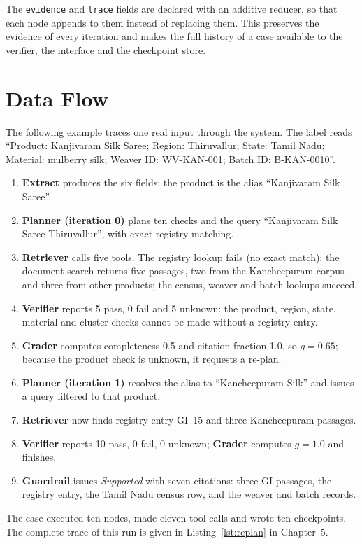 The \texttt{evidence} and \texttt{trace} fields are declared with an additive reducer, so that each
node appends to them instead of replacing them. This preserves the evidence of every iteration and
makes the full history of a case available to the verifier, the interface and the checkpoint store.

\section{Data Flow}

The following example traces one real input through the system. The label reads ``Product: Kanjivaram
Silk Saree; Region: Thiruvallur; State: Tamil Nadu; Material: mulberry silk; Weaver ID: WV-KAN-001;
Batch ID: B-KAN-0010''.

\begin{enumerate}[itemsep=2pt]
\item \textbf{Extract} produces the six fields; the product is the alias ``Kanjivaram Silk Saree''.
\item \textbf{Planner (iteration 0)} plans ten checks and the query ``Kanjivaram Silk Saree
Thiruvallur'', with exact registry matching.
\item \textbf{Retriever} calls five tools. The registry lookup fails (no exact match); the document
search returns five passages, two from the Kancheepuram corpus and three from other products; the
census, weaver and batch lookups succeed.
\item \textbf{Verifier} reports 5 pass, 0 fail and 5 unknown: the product, region, state, material and
cluster checks cannot be made without a registry entry.
\item \textbf{Grader} computes completeness 0.5 and citation fraction 1.0, so $g = 0.65$; because the
product check is unknown, it requests a re-plan.
\item \textbf{Planner (iteration 1)} resolves the alias to ``Kancheepuram Silk'' and issues a query
filtered to that product.
\item \textbf{Retriever} now finds registry entry GI~15 and three Kancheepuram passages.
\item \textbf{Verifier} reports 10 pass, 0 fail, 0 unknown; \textbf{Grader} computes $g = 1.0$ and
finishes.
\item \textbf{Guardrail} issues \emph{Supported} with seven citations: three GI passages, the registry
entry, the Tamil Nadu census row, and the weaver and batch records.
\end{enumerate}

The case executed ten nodes, made eleven tool calls and wrote ten checkpoints. The complete trace of
this run is given in Listing~\ref{lst:replan} in Chapter~5.
